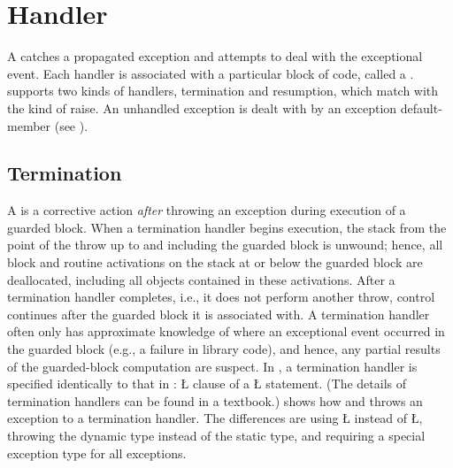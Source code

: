 \documentclass[openright,twoside]{report}
\begin{document}
\section{Handler}

A  catches a propagated exception and attempts to deal with the exceptional event.
Each handler is associated with a particular block of code, called a .
\uC supports two kinds of handlers, termination and resumption, which match with the kind of raise.
An unhandled exception is dealt with by an exception default-member (see ).


\subsection{Termination}

A  is a corrective action \emph{after} throwing an exception during execution of a guarded block.
When a termination handler begins execution, the stack from the point of the throw up to and including the guarded block is unwound;
hence, all block and routine activations on the stack at or below the guarded block are deallocated, including all objects contained in these activations.
After a termination handler completes, i.e., it does not perform another throw, control continues after the guarded block it is associated with.
A termination handler often only has approximate knowledge of where an exceptional event occurred in the guarded block (e.g., a failure in library code), and hence, any partial results of the guarded-block computation are suspect.
In \uC, a termination handler is specified identically to that in \CC: \LGinlinetrue\LGbegin\lgrinde\L{}\endlgrinde\LGend{} clause of a \LGinlinetrue\LGbegin\lgrinde\L{}\endlgrinde\LGend{} statement.
(The details of termination handlers can be found in a \CC textbook.)
 shows how \CC and \uC throws an exception to a termination handler.
The differences are using \LGinlinetrue\LGbegin\lgrinde\L{}\endlgrinde\LGend{} instead of \LGinlinetrue\LGbegin\lgrinde\L{}\endlgrinde\LGend{}, throwing the dynamic type instead of the static type, and requiring a special exception type for all exceptions.
\end{document}
